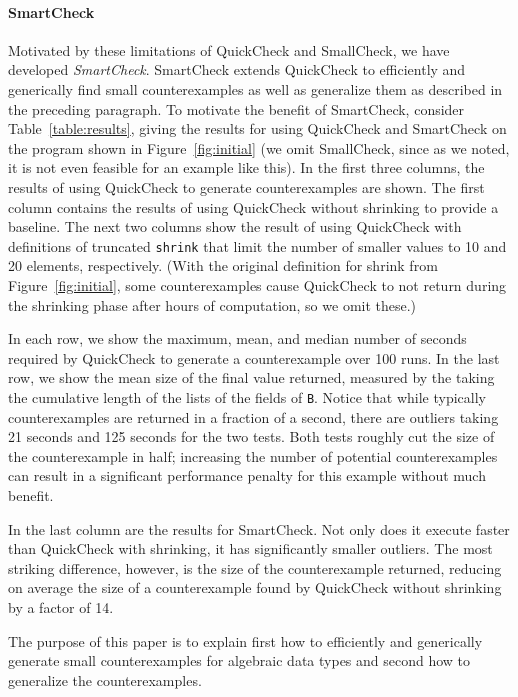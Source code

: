 \documentclass[10pt]{sigplanconf}
\newcommand{\ttp}[1]{\texttt{#1}}
\begin{document}
\paragraph{SmartCheck}
Motivated by these limitations of QuickCheck and SmallCheck, we have developed
\emph{SmartCheck}.  SmartCheck extends QuickCheck to efficiently and generically
find small counterexamples as well as generalize them as described in the
preceding paragraph.  To motivate the benefit of SmartCheck, consider
Table~\ref{table:results}, giving the results for using QuickCheck and
SmartCheck on the program shown in Figure~\ref{fig:initial} (we omit SmallCheck,
since as we noted, it is not even feasible for an example like this).  In the
first three columns, the results of using QuickCheck to generate counterexamples
are shown.  The first column contains the results of using QuickCheck without
shrinking to provide a baseline.  The next two columns show the result of using
QuickCheck with definitions of truncated \ttp{shrink} that limit the number of
smaller values to 10 and 20 elements, respectively.  (With the original
definition for shrink from Figure~\ref{fig:initial}, some counterexamples cause
QuickCheck to not return during the shrinking phase after hours of computation,
so we omit these.)

In each row, we show the maximum, mean, and median number of seconds required by
QuickCheck to generate a counterexample over 100 runs.  In the last row, we show
the mean size of the final value returned, measured by the taking the cumulative
length of the lists of the fields of \ttp{B}.  Notice that while typically
counterexamples are returned in a fraction of a second, there are outliers
taking 21 seconds and 125 seconds for the two tests.  Both tests roughly cut the
size of the counterexample in half; increasing the number of potential
counterexamples can result in a significant performance penalty for this example
without much benefit.

In the last column are the results for SmartCheck.  Not only does it execute
faster than QuickCheck with shrinking, it has significantly smaller outliers.
The most striking difference, however, is the size of the counterexample
returned, reducing on average the size of a counterexample found by QuickCheck
without shrinking by a factor of 14.

The purpose of this paper is to explain first how to efficiently and generically
generate small counterexamples for algebraic data types and second how to
generalize the counterexamples.
\end{document}
